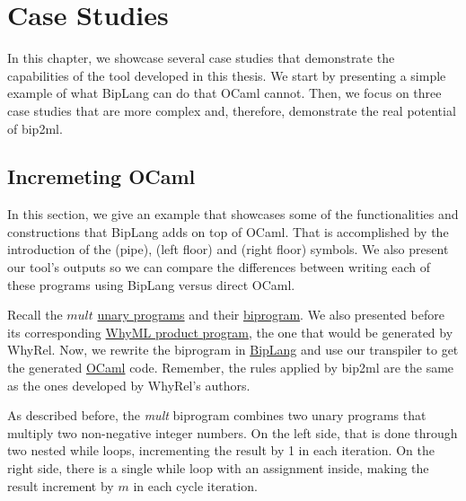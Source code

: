 
%

\chapter{Case Studies}
\label{cha:case_studies}

In this chapter, we showcase several case studies that demonstrate the capabilities of the tool developed in this thesis.
We start by presenting a simple example of what BipLang can do that OCaml cannot.
Then, we focus on three case studies that are more complex and, therefore, demonstrate the real potential of bip2ml.


\section{Incremeting OCaml}
\label{sec:incrementing}

In this section, we give an example that showcases some of the functionalities and constructions that BipLang adds on top of OCaml.
That is accomplished by the introduction of the \bm{$\langle|\rangle$} (pipe), \bm{$\lfloor$} (left floor) and \bm{$\rfloor$} (right floor) symbols.
We also present our tool's outputs so we can compare the differences between writing each of these programs using BipLang versus direct OCaml.

Recall the $mult$ \hyperref[fig:mult_source_programs]{unary programs} and their \hyperref[fig:mult_biprogram]{biprogram}.
We also presented before its corresponding \hyperref[fig:translation_ex]{WhyML product program}, the one that would be generated by WhyRel.
Now, we rewrite the biprogram in \hyperref[fig:mult-biplang]{BipLang} and use our transpiler to get the generated \hyperref[fig:mult-ml]{OCaml} code.
Remember, the rules applied by bip2ml are the same as the ones developed by WhyRel's authors.

As described before, the \emph{mult} biprogram combines two unary programs that multiply two non-negative integer numbers.
On the left side, that is done through two nested while loops, incrementing the result by 1 in each iteration.
On the right side, there is a single while loop with an assignment inside, making the result increment by $m$ in each cycle iteration.

